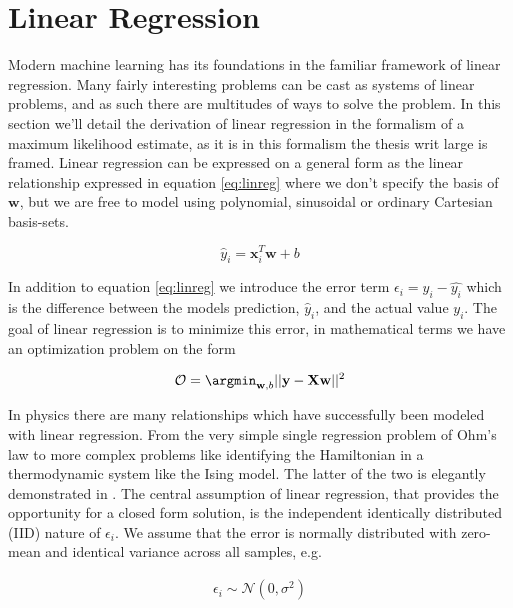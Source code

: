 
\section{Linear Regression}\label{sec:LinReg}

Modern machine learning has its foundations in the familiar framework of linear regression. Many fairly interesting problems can be cast as systems of linear problems, and as such there are multitudes of ways to solve the problem. In this section we'll detail the derivation of linear regression in the formalism of a maximum likelihood estimate, as it is in this formalism the thesis writ large is framed. Linear regression can be expressed on a general form as the linear relationship expressed in equation \ref{eq:linreg} where we don't specify the basis of $\mathbf{w}$, but we are free to model using polynomial, sinusoidal or ordinary Cartesian basis-sets.

\begin{equation}\label{eq:linreg}
\hat{y}_i = \mathbf{x}_i^T\mathbf{w} + b
\end{equation}

\noindent In addition to equation \ref{eq:linreg} we introduce the error term $\epsilon_i= y_i - \hat{y_i}$ which is the difference between the models prediction, $\hat{y}_i$, and the actual value $y_i$. The goal of linear regression is to minimize this error, in mathematical terms we have an optimization problem on the form

\begin{equation}
\mathcal{O} = \argmin _{\mathbf{w}, b} || \mathbf{y} - \mathbf{Xw} ||^2
\end{equation}

\noindent In physics there are many relationships which have successfully been modeled with linear regression. From the very simple single regression problem of Ohm's law to more complex problems like identifying the Hamiltonian in a thermodynamic system like the Ising model. The latter of the two is elegantly demonstrated in \citet{Mehta2019}. The central assumption of linear regression, that provides the opportunity for a closed form solution, is the independent identically distributed (IID) nature of $\epsilon_i$. We assume that the error is normally distributed with zero-mean and identical variance across all samples, e.g. 

\begin{align}
\epsilon_i \sim \mathcal{N}(0, \sigma^2)
\end{align}

